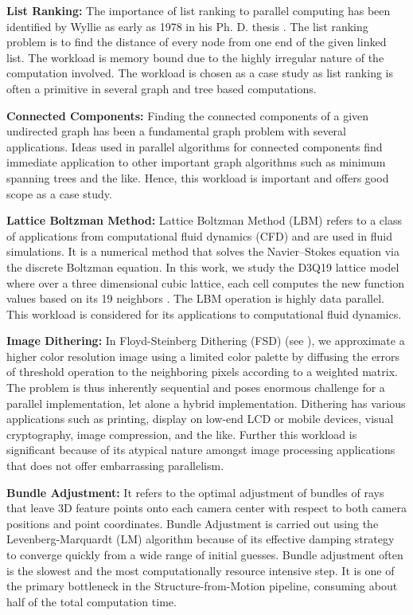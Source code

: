 \documentclass[11pt]{article}
\begin{document}
{\bf List Ranking: } The importance of list ranking to parallel computing
has been identified by Wyllie as early as 1978 in his Ph. D. thesis
\cite{W79}. The list ranking problem is to find the distance of every
node from one end of the given linked list. The workload is memory bound due to
the highly irregular nature of the computation involved. The workload is
chosen as a case study as list ranking is often a primitive in several
graph and tree based computations.

{\bf Connected Components: } Finding the connected components of a given
undirected graph has been a fundamental graph problem with several
applications. Ideas used
in parallel algorithms for connected components find immediate application
to other important graph algorithms such as minimum spanning trees and the
like. Hence, this workload is important and offers good scope as a case
study. 

{\bf Lattice Boltzman Method: } Lattice Boltzman Method (LBM) refers to a class of
applications from computational fluid dynamics (CFD) and are used in fluid
simulations. It is a numerical method that solves the Navier--Stokes equation 
via the discrete Boltzman equation. In this work, we study the D3Q19 lattice
model where over a three dimensional cubic lattice, each cell computes the new
function values based on its 19 neighbors \cite{lbm1}. 
The LBM operation is highly data parallel. This workload is considered
for its applications to computational fluid dynamics.


{\bf Image Dithering: }
In Floyd-Steinberg Dithering (FSD) (see \cite{hipc11pjn}), we approximate 
a higher color resolution image using a limited color palette by diffusing 
the errors of threshold operation to the neighboring pixels according to a
weighted matrix. The problem is thus 
inherently sequential and poses enormous challenge for a parallel 
implementation, let alone a hybrid implementation. Dithering has
various applications such as printing, display on low-end LCD or mobile
devices, visual cryptography, image compression, and the like. Further
this workload is significant because of its atypical nature amongst
image processing applications that does not offer embarrassing
parallelism.


{\bf Bundle Adjustment: }It refers to the optimal adjustment of bundles of
rays that leave 3D feature
points onto each camera center  with respect to both camera positions and point
coordinates. Bundle Adjustment is carried out using the Levenberg-Marquardt (LM)
algorithm \cite{b3,b4} because of its effective damping strategy to converge quickly
from a wide range of initial guesses.
Bundle adjustment often is the slowest and the most computationally resource
intensive step. It is one of the primary bottleneck in the
Structure-from-Motion pipeline, consuming about half of the total computation time.
\end{document}
